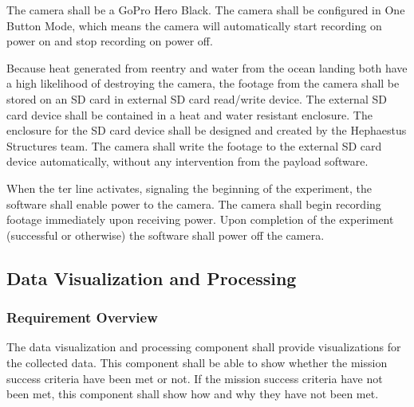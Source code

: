 \documentclass[letterpaper,10pt]{article}
\begin{document}
The camera shall be a GoPro Hero Black.
The camera shall be configured in One Button Mode, which means the  camera will
automatically start recording on power on and stop recording on power off. 

Because heat generated from reentry and water from the ocean landing both have
a high likelihood of destroying the camera, the footage from the camera shall be
stored on an SD card in external SD card read/write device. 
The external SD card device shall be contained in a heat and water resistant enclosure.
The enclosure for the SD card device shall be designed and created by the Hephaestus Structures team.
The camera shall write the footage to the external SD card device automatically,
without any intervention from the payload software. 

When the \gls{ter} line activates, signaling the beginning of the experiment,
the software shall enable power to the camera.
The camera shall begin recording footage immediately upon receiving power. 
Upon completion of the experiment (successful or otherwise) the software shall
power off the camera. 


\subsection{Data Visualization and Processing}
\subsubsection{Requirement Overview}
The data visualization and processing component shall provide visualizations
for the collected data.
This component shall be able to show whether the mission success criteria have
been met or not.
If the mission success criteria have not been met, this component shall show how
and why they have not been met.
\end{document}
